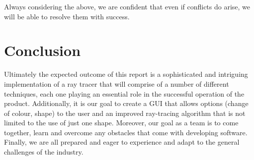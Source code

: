 \documentclass[11pt,a4paper]{article}
\begin{document}
Always considering the above, we are confident that even if conflicts do arise, we will be able to resolve them with success.

\section{Conclusion}

Ultimately the expected outcome of this report is a sophisticated and intriguing implementation of a ray tracer that will comprise of a number of different techniques, each one playing an essential role in the successful operation of the product. Additionally, it is our goal to create a GUI that allows options (change of colour, shape) to the user and an improved ray-tracing algorithm that is not limited to the use of just one shape. Moreover, our goal as a team is to come together, learn and overcome any obstacles that come with developing software. Finally, we are all prepared and eager to experience and adapt to the general challenges of the industry.
\end{document}
